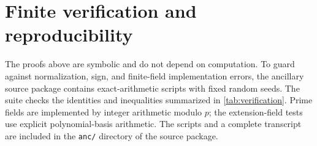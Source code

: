 \documentclass[11pt,letterpaper]{amsart}
\theoremstyle{definition}
\theoremstyle{remark}
\newcommand{\1}{\mathbf 1}
\begin{document}
\appendix
\section{Finite verification and reproducibility}\label{app:verification}

The proofs above are symbolic and do not depend on computation.  To guard against normalization, sign, and finite-field implementation errors, the ancillary source package contains exact-arithmetic scripts with fixed random seeds.  The suite checks the identities and inequalities summarized in \cref{tab:verification}.  Prime fields are implemented by integer arithmetic modulo $p$; the extension-field tests use explicit polynomial-basis arithmetic.  The scripts and a complete transcript are included in the \texttt{anc/} directory of the source package.
\end{document}
